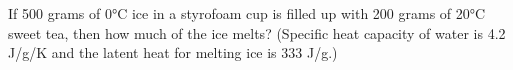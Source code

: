 \documentclass[letterpaper,12pt,addpoints]{exam}
\begin{document}
\begin{questions}
		\clearpage
		
		
		\clearpage
		
		\question[10] If 500 grams of 0\si{\celsius} ice in a styrofoam cup is filled up with 200 grams of 20\si{\celsius} sweet tea, then how much of the ice melts? (Specific heat capacity of water is 4.2 \si[per-mode=symbol]{\joule\per\gram\per\kelvin} and the latent heat for melting ice is 333 \si{\joule/\gram}.)
		
	\end{questions}
\end{document}
